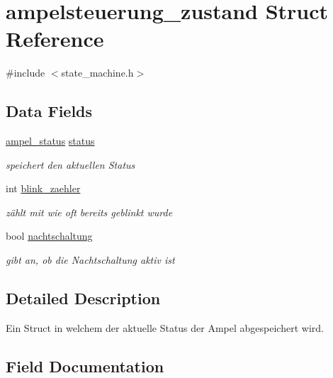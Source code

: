 \hypertarget{structampelsteuerung__zustand}{}\section{ampelsteuerung\+\_\+zustand Struct Reference}
\label{structampelsteuerung__zustand}


{\ttfamily \#include $<$state\+\_\+machine.\+h$>$}

\subsection*{Data Fields}
\begin{DoxyCompactItemize}
\item 
\hyperlink{state__machine_8h_a89d088d3adc3c394733a383c6ac53a6d}{ampel\+\_\+status} \hyperlink{structampelsteuerung__zustand_a7f874ec6002fe3f3f6fcd33f83d402b6}{status}
\begin{DoxyCompactList}\small\item\em speichert den aktuellen Status \end{DoxyCompactList}\item 
int \hyperlink{structampelsteuerung__zustand_a29020f09e616348272ca1d9679e708f3}{blink\+\_\+zaehler}
\begin{DoxyCompactList}\small\item\em zählt mit wie oft bereits geblinkt wurde \end{DoxyCompactList}\item 
bool \hyperlink{structampelsteuerung__zustand_ab6a8a2380b414e129f8799b44e7ae5d5}{nachtschaltung}
\begin{DoxyCompactList}\small\item\em gibt an, ob die Nachtschaltung aktiv ist \end{DoxyCompactList}\end{DoxyCompactItemize}


\subsection{Detailed Description}
Ein Struct in welchem der aktuelle Status der Ampel abgespeichert wird. 

\subsection{Field Documentation}
\hypertarget{structampelsteuerung__zustand_a29020f09e616348272ca1d9679e708f3}{}

